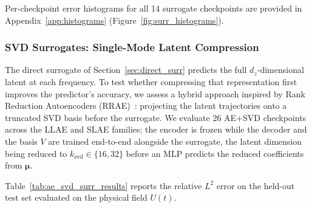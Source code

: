 ﻿\documentclass[a4paper,12pt]{article}
\theoremstyle{definition}
\theoremstyle{remark}
\newcommand{\vmu}{\bm{\mu}}
\begin{document}
Per-checkpoint error histograms for all 14 surrogate checkpoints are provided in Appendix~\ref{app:histograms} (Figure~\ref{fig:surr_histograms}).

\subsubsection{SVD Surrogates: Single-Mode Latent Compression}
\label{sec:ae_svd_surr}

The direct surrogate of Section~\ref{sec:direct_surr} predicts the full $d_z$-dimensional latent at each frequency. To test whether compressing that representation first improves the predictor's accuracy, we assess a hybrid approach inspired by Rank Reduction Autoencoders (RRAE)~\cite{mounayer2025}: projecting the latent trajectories onto a truncated SVD basis before the surrogate. We evaluate 26 AE+SVD checkpoints across the LLAE and SLAE families; the encoder is frozen while the decoder and the basis $V$ are trained end-to-end alongside the surrogate, the latent dimension being reduced to $k_{\mathrm{svd}} \in \{16, 32\}$ before an MLP predicts the reduced coefficients from $\vmu$.

Table~\ref{tab:ae_svd_surr_results} reports the relative $L^2$ error on the held-out test set evaluated on the physical field $U(t)$.
\end{document}
